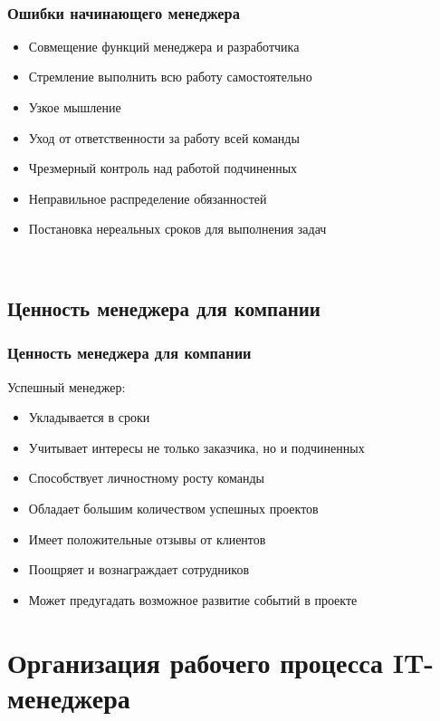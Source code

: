 \documentclass{../industrial-development}
\begin{document}
{~\cite{How_to_be_a_good_IT-manager}



\begin{frame} \frametitle{Ошибки начинающего менеджера}
\begin{itemize}	
		\item Совмещение функций менеджера и разработчика	
		\item Стремление выполнить всю работу самостоятельно
	 	\item Узкое мышление
	 	\item Уход от ответственности за работу всей команды
		\item Чрезмерный контроль над работой подчиненных
	 	\item Неправильное распределение обязанностей
	 	\item Постановка нереальных сроков для выполнения задач
 \end{itemize}
\end{frame}
\lecturenotes

~\cite{How_to_be_a_good_IT-manager}


\subsection{Ценность менеджера для компании}
\begin{frame} \frametitle{Ценность менеджера для компании}
 \begin{block}{Успешный менеджер:}
\begin{itemize}
  \item Укладывается в сроки
  \item Учитывает интересы не только заказчика, но и подчиненных 
  \item Способствует личностному росту команды
  \item Обладает большим количеством успешных проектов
  \item Имеет положительные отзывы от клиентов
  \item Поощряет и вознаграждает сотрудников
  \item Может предугадать возможное развитие событий в проекте

  \end{itemize}
 \end{block}
\end{frame}
\lecturenotes


\section{Организация рабочего процесса IT-менеджера}

}
\end{document}
